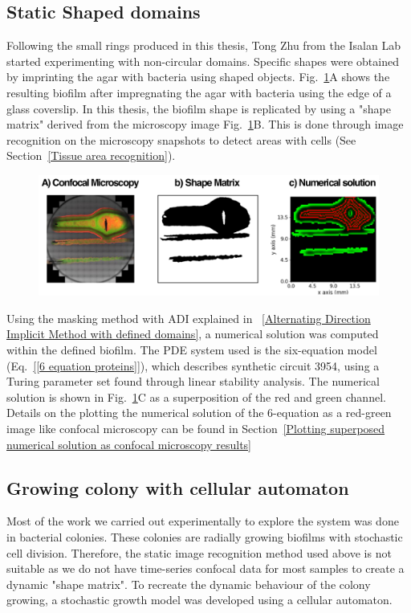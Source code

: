 \subsection{Static Shaped domains}
Following the small rings produced in this thesis, Tong Zhu from the Isalan Lab started experimenting with non-circular domains.
Specific shapes were obtained by imprinting the agar with bacteria using shaped objects.
Fig.~\ref{shmoo}A shows the resulting biofilm after impregnating the agar with bacteria using the edge of a glass coverslip. %
In this thesis, the biofilm shape is replicated by using a "shape matrix" derived from the microscopy image Fig.~\ref{shmoo}B.
This is done through image recognition on the microscopy snapshots to detect areas with cells (See Section~\ref{Tissue area recognition}).


\begin{figure}[H]
    \centering

    \includegraphics[width=1\textwidth]{chapters/Chapter 3/shmoo}
    \caption{}
    \label{shmoo}
\end{figure}
Using the masking method with ADI explained in ~\ref{Alternating Direction Implicit Method with defined domains}, a numerical solution was computed within the defined biofilm.
The PDE system used is the six-equation model (Eq.~\ref{[6 equation proteins]}), which describes synthetic circuit 3954, using a Turing parameter set found through linear stability analysis.
The numerical solution is shown in Fig.~\ref{shmoo}C as a superposition of the red and green channel.
Details on the plotting the numerical solution of the 6-equation as a red-green image like confocal microscopy can be found in Section~\ref{Plotting superposed numerical solution as confocal microscopy results}

\subsection{Growing colony with cellular automaton}
Most of the work we carried out experimentally to explore the system was done in bacterial colonies.
These colonies are radially growing biofilms with stochastic cell division.
Therefore, the static image recognition method used above is not suitable as we do not have time-series confocal data for most samples to create a dynamic "shape matrix".
To recreate the dynamic behaviour of the colony growing, a stochastic growth model was developed using a cellular automaton.

